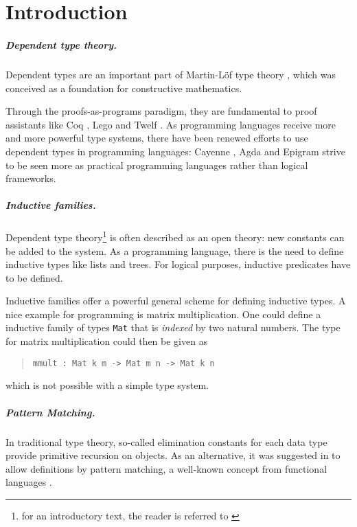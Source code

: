 \chapter{Introduction}

\paragraph*{Dependent type theory.}

Dependent types are an important part of Martin-L\"of type theory \cite{mart84}, which 
was conceived as a foundation for constructive mathematics.

Through the proofs-as-programs paradigm, they are fundamental to proof assistants 
like Coq \cite{coq}, Lego \cite{pollack94theory} and Twelf \cite{pfenning99system}.
As programming languages receive more and more powerful type systems, there have been renewed efforts to use dependent types in programming languages: Cayenne \cite{augustsson98cayenne}, Agda \cite{norell:thesis} and Epigram \cite{epigram} strive to be seen more as practical programming languages rather than logical frameworks.

\paragraph*{Inductive families.}
Dependent type theory\footnote{for an introductory text, the reader is referred to \cite{NPS:promlt}}
 is often described as an open theory: new constants can be added to the system.
As a programming language, there is the need to define inductive types like lists and trees.
For logical purposes, inductive predicates have to be defined. 

Inductive families \cite{dybjer94inductive} offer a powerful general scheme for defining inductive types.  
A nice example for programming is matrix multiplication.
One could define a inductive family of types \verb+Mat+ that is \emph{indexed} by two natural numbers.
The type for matrix multiplication could then be given as 
\begin{quote}
\begin{verbatim}
mmult : Mat k m -> Mat m n -> Mat k n 
\end{verbatim}
\end{quote}
which is not possible with a simple type system.
\paragraph*{Pattern Matching.}
In traditional type theory, so-called elimination constants for each data type provide primitive recursion on objects. 
As an alternative, it was suggested in \cite{coquand92pattern} to allow definitions by pattern matching, a well-known concept from functional languages \cite{DBLP:conf/fpca/Augustsson85}.

